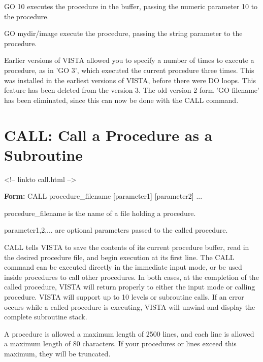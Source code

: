 \begin{example}
  \item[GO 10\hfill]{executes the procedure in the buffer,
       passing the numeric parameter 10 to the procedure.}
  \item[GO mydir/image\hfill]{execute the procedure, passing the
        string parameter to the procedure.}
\end{example}

Earlier versions of VISTA allowed you to specify a number of times to
execute a procedure, as in 'GO 3', which executed the current procedure
three times.  This was installed in the earliest versions of VISTA, before
there were DO loops.  This feature has been deleted from the version 3.
The old version 2 form 'GO filename' has been eliminated, since this can
now be done with the CALL command.

\section{CALL: Call a Procedure as a Subroutine}
\begin{rawhtml}
<!-- linkto call.html -->
\end{rawhtml}

\begin{command}
  \item[\textbf{Form: } CALL procedure\_filename {[parameter1]} {[parameter2]} ...\hfill]{}
  \item[procedure\_filename]{is the name of a file holding a procedure.}
  \item[parameter1,2,...]{are optional parameters passed to the called procedure.}
\end{command}

CALL tells VISTA to save the contents of its current procedure buffer, read
in the desired procedure file, and begin execution at its first line.  The
CALL command can be executed directly in the immediate input mode, or be
used inside procedures to call other procedures.  In both cases, at the
completion of the called procedure, VISTA will return properly to either
the input mode or calling procedure.  VISTA will support up to 10 levels or
subroutine calls.  If an error occurs while a called procedure is
executing, VISTA will unwind and display the complete subroutine stack.

A procedure is allowed a maximum length of 2500 lines, and each line is
allowed a maximum length of 80 characters.  If your procedures or lines
exceed this maximum, they will be truncated.

